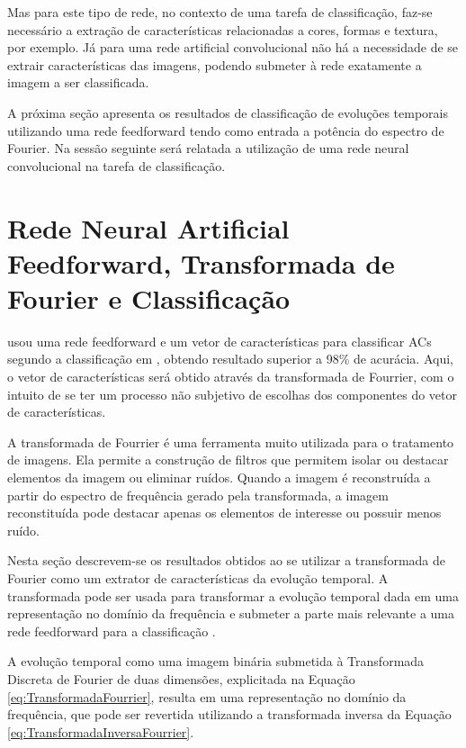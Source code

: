 \documentclass[12pt,a4paper]{report}
\begin{document}
	Mas para este tipo de rede, no contexto de uma tarefa de classificação, faz-se necessário a extração de características relacionadas a cores, formas e textura, por exemplo. Já para uma rede artificial convolucional não há a necessidade de se extrair características das imagens, podendo submeter à rede exatamente a imagem a ser classificada.
	
	A próxima seção apresenta os resultados de classificação de evoluções temporais utilizando uma rede feedforward tendo como entrada a potência do espectro de Fourier. Na sessão seguinte será relatada a utilização de uma rede neural convolucional na tarefa de classificação.
	
	
	\section{Rede Neural Artificial Feedforward, Transformada de Fourier e Classificação}
	
	 usou uma rede feedforward e um vetor de características para classificar ACs segundo a classificação em , obtendo resultado superior a 98\% de acurácia. Aqui, o vetor de características será obtido através da transformada de Fourrier, com o intuito de se ter um processo não subjetivo de escolhas dos componentes do vetor de características. 
	
	A transformada de Fourrier é uma ferramenta muito utilizada para o tratamento de imagens. Ela permite a construção de filtros que permitem isolar ou destacar elementos da imagem ou eliminar ruídos. Quando a imagem é reconstruída a partir do espectro de frequência gerado pela transformada, a imagem reconstituída pode destacar apenas os elementos de interesse ou possuir menos ruído.
	
	Nesta seção descrevem-se os resultados obtidos ao se utilizar a transformada de Fourier como um extrator de características da evolução temporal. A transformada pode ser usada para transformar a evolução temporal dada em uma representação no domínio da frequência e submeter a parte mais relevante a uma rede feedforward para a classificação \cite{Gonzales:1987:DIP:22881}. 
	
	A evolução temporal como uma imagem binária submetida à Transformada Discreta de Fourier de duas dimensões, explicitada na Equação \ref{eq:TransformadaFourrier}, resulta em uma representação no domínio da frequência, que pode ser revertida utilizando a transformada inversa da Equação \ref{eq:TransformadaInversaFourrier}.
	
\end{document}
